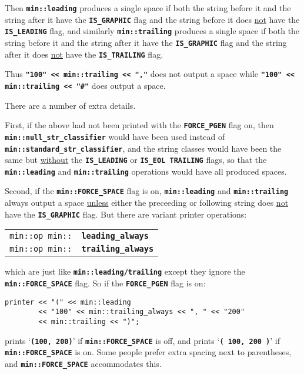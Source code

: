\documentclass[12pt]{article}
\makeatletter
\newcommand{\TT}[1]{{\tt \bfseries #1}}
\newcommand{\ttindex}[1]{\index{#1@{\tt #1}}}
\newcommand{\EOL}{\penalty \exhyphenpenalty}
\newenvironment{indpar}[1][0.3in]%
	{\begin{list}{}%
		     {\setlength{\itemsep}{0in}%
		      \setlength{\topsep}{0in}%
		      \setlength{\parsep}{1ex}%
		      \setlength{\labelwidth}{#1}%
		      \setlength{\leftmargin}{#1}%
		      \addtolength{\leftmargin}{\labelsep}}%
	 \item}%
	{\end{list}}
\newcommand{\LABEL}[1]{\label{#1}}
\newcommand{\MINKEY}[1]%
	   {\TT{#1}\ttindex{min::#1}\ttindex{#1}}
\makeatother
\begin{document}
Then \TT{min::leading} produces a single
space if both the string before it and the string after it have
the \TT{IS\_\EOL GRAPHIC} flag and the string before it does
\underline{not} have the \TT{IS\_\EOL LEADING} flag, and
similarly \TT{min::trailing} produces a single
space if both the string before it and the string after it have
the \TT{IS\_\EOL GRAPHIC} flag and the string after it does
\underline{not} have the \TT{IS\_\EOL TRAILING} flag.

Thus \TT{"100" <{}< min::trailing <{}< ","} does not output a space
while \TT{"100" <{}< min::\EOL trail\-ing <{}< "\#"} does output a space.

There are a number of extra details.

First, if the above had not been printed with the \TT{FORCE\_\EOL PGEN}
flag on, then \TT{min::\EOL null\_\EOL str\_\EOL classifier} would have
been used instead of \TT{min::\EOL standard\_\EOL str\_\EOL classifier},
and the string classes would have been the same but \underline{without}
the \TT{IS\_\EOL LEADING} or \TT{IS\_EOL TRAILING} flags, so that the
\TT{min::\EOL leading} and \TT{min::\EOL trailing} operations would have all
produced spaces.

Second, if the \TT{min::FORCE\_SPACE} flag is on, \TT{min::leading}
and \TT{min::trailing} always output a space \underline{unless}
either the preceeding or following string does \underline{not} have
the \TT{IS\_\EOL GRAPHIC} flag.  But there are variant printer
operations:

\begin{indpar}[1em]\begin{tabular}{r@{}l}
\verb|min::op min::| & \MINKEY{leading\_always}
\LABEL{MIN::LEADING_ALWAYS} \\
\verb|min::op min::| & \MINKEY{trailing\_always}
\LABEL{MIN::TRAILING_ALWAYS} \\
\end{tabular}\end{indpar}

which are just like \TT{min::leading/trailing} except they
ignore the \TT{min::\EOL FORCE\_\EOL SPACE} flag.  So if
the \TT{FORCE\_\EOL PGEN} flag is on:

\begin{indpar}\begin{verbatim}
printer << "(" << min::leading
        << "100" << min::trailing_always << ", " << "200"
        << min::trailing << ")";
\end{verbatim}\end{indpar}
prints `\TT{(100, 200)}' if \TT{min::\EOL FORCE\_\EOL SPACE} is off, and
prints `\TT{( 100, 200 )}' if \TT{min::\EOL FORCE\_\EOL SPACE} is on.
Some people prefer extra spacing next to parentheses, and
\TT{min::\EOL FORCE\_\EOL SPACE} accommodates this.
\end{document}
